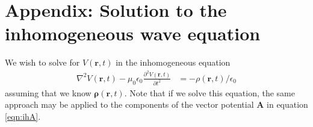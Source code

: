 \documentclass[12pt]{article}
\renewcommand{\vec}[1]{\boldsymbol{#1}}
\begin{document}

\newpage

\section{Appendix: Solution to the inhomogeneous wave equation}

We wish to solve for $V(\vec{r}, t)$ in the inhomogeneous equation
\begin{align}\label{eqn:ihV2}
\nabla^2 V(\vec{r}, t) - \mu_0\epsilon_0 \frac{\partial^2 V(\vec{r}, t)}{\partial t^2} &= -\rho(\vec{r}, t) / \epsilon_0
\end{align}
assuming that we know $\vec{\rho}(\vec{r}, t)$.  Note that if we solve this equation, the same approach may be applied to the components
of the vector potential $\vec{A}$ in equation \ref{eqn:ihA}.
\end{document}
